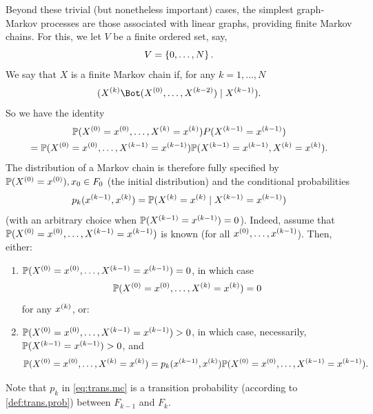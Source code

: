 Beyond these trivial (but nonetheless
important) cases, the simplest graph-Markov processes are those
associated with linear graphs, providing finite Markov
chains. For this, we let $V$ be a finite ordered set, say,
$$
V = \left\{ 0, \ldots, N \right\}.
$$
We say that $X$ is a finite Markov chain if, for any $k=1,
\ldots, N$
$$
\cind{\pe X k}{(\pe X 0, \ldots, \pe X{k-2})}{\pe X{k-1}}.
$$
So we have the identity
\begin{multline*}
\bm{\mathbb P}(X^{(0)}=x^{(0)}, \ldots, X^{(k)}=x^{(k)})P(X^{(k-1)}=x^{(k-1)})\\
 = \bm{\mathbb P}(X^{(0)}= x^{(0)},
\ldots, X^{(k-1)}= x^{(k-1)})\bm{\mathbb P}(X^{(k-1)}=x^{(k-1)}, X^{(k)}=x^{(k)}).
\end{multline*}
The distribution of a Markov chain is therefore fully specified by
$\bm{\mathbb P}(X^{(0)} = x^{(0)}), x_0\in F_0$ (the initial distribution) and  the conditional probabilities
\begin{equation}
\label{eq:trans.mc}
p_k( x^{(k-1)}, x^{(k)}) = \bm{\mathbb P}(X^{(k)}=x^{(k)} \mid X^{(k-1)} = x^{(k-1)})
\end{equation}
(with an arbitrary choice when $\bm{\mathbb P}(X^{(k-1)}=x^{(k-1)}) = 0$). Indeed,
assume that $\bm{\mathbb P}(X^{(0)}=x^{(0)},
\ldots, X^{(k-1)}=x^{(k-1)})$ is known (for all $x^{(0)}, \ldots,
x^{(k-1)}$). Then, either:
\begin{enumerate}[label = (\roman*)]
\item $\bm{\mathbb P}(X^{(0)}= x^{(0)},
\ldots, X^{(k-1)}=x^{(k-1)})=0$, in which case 
\[
\bm{\mathbb P}(X^{(0)}=x^{(0)},
\ldots, X^{(k)}=x^{(k)})=0
\]
 for any $x^{(k)}$, or:
 \item $\bm{\mathbb P}(X^{(0)}=x^{(0)},
\ldots, X^{(k-1)}=x^{(k-1)})>0$, in which case, necessarily, $\bm{\mathbb P}(X^{(k-1)}=x^{(k-1)}) > 0$, and
$$
\bm{\mathbb P}(X^{(0)}=x^{(0)}, \ldots, X^{(k)}=x^{(k)}) = p_k(x^{(k-1)}, x^{(k)}) \bm{\mathbb P}(X^{(0)}=x^{(0)},
\ldots, X^{(k-1)}=x^{(k-1)}).
$$
\end{enumerate}
Note that $p_k$ in \cref{eq:trans.mc} is a transition probability (according to \cref{def:trans.prob}) between $F_{k-1}$ and $F_k$.


